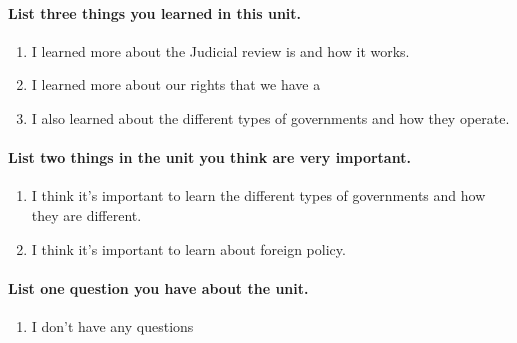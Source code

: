 \paragraph{List three things you learned in this unit.}

\begin{enumerate}
  \item I learned more about the Judicial review is and how it works.
  \item I learned more about our rights that we have a
  \item I also learned about the different types of governments and how they
    operate.
\end{enumerate}

\paragraph{List two things in the unit you think are very important.}

\begin{enumerate}
  \item I think it's important to learn the different types of governments and
    how they are different.
  \item I think it's important to learn about foreign policy.
\end{enumerate}

\paragraph{List one question you have about the unit.}

\begin{enumerate}
  \item I don't have any questions
\end{enumerate}
